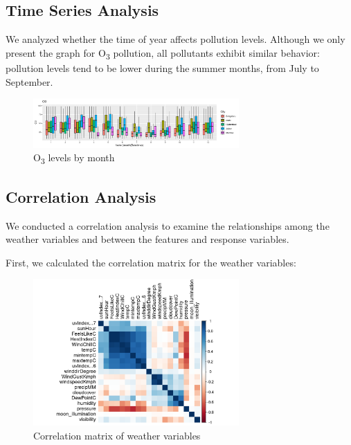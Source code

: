 \documentclass[12pt]{article}
\begin{document}
\subsection{Time Series Analysis}

We analyzed whether the time of year affects pollution levels. Although we only present the graph for O\textsubscript{3} pollution, all pollutants exhibit similar behavior: pollution levels tend to be lower during the summer months, from July to September.

\begin{figure}[H]
    \centering
    \includegraphics[width=0.7\textwidth]{o3-by-month.png}
    \caption{O\textsubscript{3} levels by month}
    \label{fig:o3_by_month}
\end{figure}

\subsection{Correlation Analysis}

We conducted a correlation analysis to examine the relationships among the weather variables and between the features and response variables.

First, we calculated the correlation matrix for the weather variables:

\begin{figure}[H]
    \centering
    \includegraphics[width=0.7\textwidth]{correlation-matrix.png}
    \caption{Correlation matrix of weather variables}
    \label{fig:correlation_matrix}
\end{figure}
\end{document}

